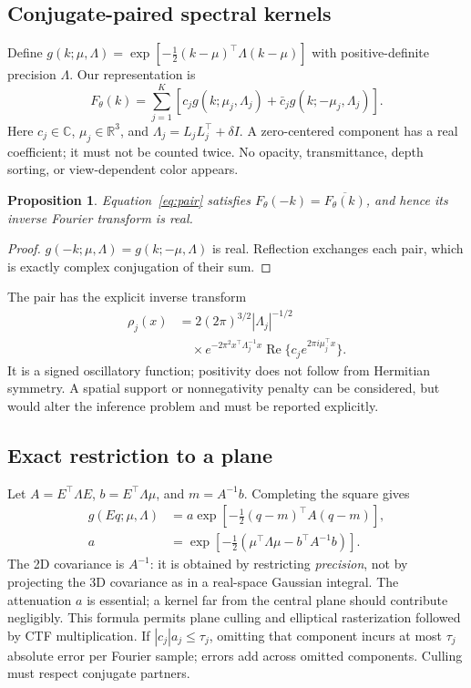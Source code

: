 \documentclass{article}
\newtheorem{proposition}{Proposition}
\newcommand{\R}{\mathbb{R}}
\newcommand{\C}{\mathbb{C}}
\begin{document}
\subsection{Conjugate-paired spectral kernels}
Define $g(k;\mu,\Lambda)=\exp[-\frac12(k-\mu)^\top\Lambda(k-\mu)]$ with positive-definite precision $\Lambda$. Our representation is
\begin{equation}\label{eq:pair}
F_\theta(k)=\sum_{j=1}^K \left[c_jg(k;\mu_j,\Lambda_j)+\bar c_jg(k;-\mu_j,\Lambda_j)\right].
\end{equation}
Here $c_j\in\C$, $\mu_j\in\R^3$, and $\Lambda_j=L_jL_j^\top+\delta I$. A zero-centered component has a real coefficient; it must not be counted twice. No opacity, transmittance, depth sorting, or view-dependent color appears.

\begin{proposition}
Equation~\eqref{eq:pair} satisfies $F_\theta(-k)=\overline{F_\theta(k)}$, and hence its inverse Fourier transform is real.
\end{proposition}
\begin{proof}
$g(-k;\mu,\Lambda)=g(k;-\mu,\Lambda)$ is real. Reflection exchanges each pair, which is exactly complex conjugation of their sum.
\end{proof}
The pair has the explicit inverse transform
\begin{align}
\rho_j(x)&=2(2\pi)^{3/2}|\Lambda_j|^{-1/2}\nonumber\\
&\quad\times e^{-2\pi^2x^\top\Lambda_j^{-1}x}
\operatorname{Re}\{c_je^{2\pi i\mu_j^\top x}\}.
\end{align}
It is a signed oscillatory function; positivity does not follow from Hermitian symmetry. A spatial support or nonnegativity penalty can be considered, but would alter the inference problem and must be reported explicitly.

\subsection{Exact restriction to a plane}
Let $A=E^\top\Lambda E$, $b=E^\top\Lambda\mu$, and $m=A^{-1}b$. Completing the square gives
\begin{align}\label{eq:restrict}
g(Eq;\mu,\Lambda)&=a\exp[-\tfrac12(q-m)^\top A(q-m)],\\
a&=\exp[-\tfrac12(\mu^\top\Lambda\mu-b^\top A^{-1}b)].\nonumber
\end{align}
The 2D covariance is $A^{-1}$: it is obtained by restricting \emph{precision}, not by projecting the 3D covariance as in a real-space Gaussian integral. The attenuation $a$ is essential; a kernel far from the central plane should contribute negligibly. This formula permits plane culling and elliptical rasterization followed by CTF multiplication. If $|c_j|a_j\leq\tau_j$, omitting that component incurs at most $\tau_j$ absolute error per Fourier sample; errors add across omitted components. Culling must respect conjugate partners.
\end{document}
